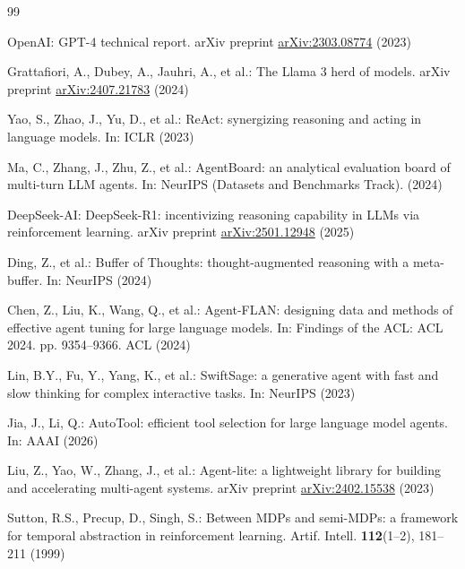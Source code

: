 \documentclass[runningheads]{llncs}
\begin{document}
\begin{thebibliography}{99}

OpenAI: GPT-4 technical report. arXiv preprint \href{https://arxiv.org/abs/2303.08774}{arXiv:2303.08774} (2023)

Grattafiori, A., Dubey, A., Jauhri, A., et al.: The Llama 3 herd of models. arXiv preprint \href{https://arxiv.org/abs/2407.21783}{arXiv:2407.21783} (2024)


Yao, S., Zhao, J., Yu, D., et al.: ReAct: synergizing reasoning and acting in language models. In: ICLR (2023)

Ma, C., Zhang, J., Zhu, Z., et al.: AgentBoard: an analytical evaluation board of multi-turn LLM agents. In: NeurIPS (Datasets and Benchmarks Track). (2024)

DeepSeek-AI: DeepSeek-R1: incentivizing reasoning capability in LLMs via reinforcement learning. arXiv preprint \href{https://arxiv.org/abs/2501.12948}{arXiv:2501.12948} (2025)

Ding, Z., et al.: Buffer of Thoughts: thought-augmented reasoning with a meta-buffer. In: NeurIPS (2024)

Chen, Z., Liu, K., Wang, Q., et al.: Agent-FLAN: designing data and methods of effective agent tuning for large language models. In: Findings of the ACL: ACL 2024. pp. 9354--9366. ACL (2024)

Lin, B.Y., Fu, Y., Yang, K., et al.: SwiftSage: a generative agent with fast and slow thinking for complex interactive tasks. In: NeurIPS (2023)

Jia, J., Li, Q.: AutoTool: efficient tool selection for large language model agents. In: AAAI (2026)

Liu, Z., Yao, W., Zhang, J., et al.: Agent-lite: a lightweight library for building and accelerating multi-agent systems. arXiv preprint \href{https://arxiv.org/abs/2402.15538}{arXiv:2402.15538} (2023)

Sutton, R.S., Precup, D., Singh, S.: Between MDPs and semi-MDPs: a framework for temporal abstraction in reinforcement learning. Artif. Intell. \textbf{112}(1--2), 181--211 (1999)


\end{thebibliography}
\end{document}
